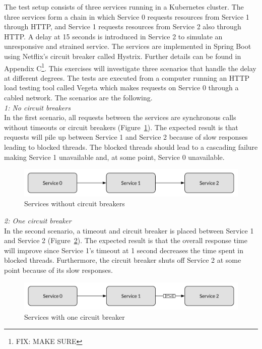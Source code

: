 \noindent The test setup consists of three services running in a Kubernetes cluster. The three services form a chain in which Service 0 requests resources from Service 1 through HTTP, and Service 1 requests resources from Service 2 also through HTTP. A delay at 15 seconds is introduced in Service 2 to simulate an unresponsive and strained service. The services are implemented in Spring Boot using Netflix's circuit breaker called Hystrix. Further details can be found in Appendix C\footnote{FIX: MAKE SURE}. This exercises will investigate three scenarios that handle the delay at different degrees. The tests are executed from a computer running an HTTP load testing tool called Vegeta which makes requests on Service 0 through a cabled network. The scenarios are the following. \\

\noindent
\textit{1: No circuit breakers}
\\
In the first scenario, all requests between the services are synchronous calls without timeouts or circuit breakers (Figure~\ref{fig:exp2_no_circuit_breaker}). The expected result is that requests will pile up between Service 1 and Service 2 because of slow responses leading to blocked threads. The blocked threads should lead to a cascading failure making Service 1 unavailable and, at some point, Service 0 unavailable.

\begin{figure}[H]
\centering
\includegraphics[scale=0.5]{figures/no_circuit_breaker_3_services}
\caption{Services without circuit breakers}
\label{fig:exp2_no_circuit_breaker}
\end{figure}

\noindent
\textit{2: One circuit breaker}
\\
In the second scenario, a timeout and circuit breaker is placed between Service 1 and Service 2 (Figure~\ref{fig:exp2_one_circuit_breaker}). The expected result is that the overall response time will improve since Service 1's timeout at 1 second decreases the time spent in blocked threads. Furthermore, the circuit breaker shuts off Service 2 at some point because of its slow responses.
\begin{figure}[H]
\centering
\includegraphics[scale=0.5]{figures/one_circuit_breaker_3_services}
\caption{Services with one circuit breaker}
\label{fig:exp2_one_circuit_breaker}
\end{figure}

